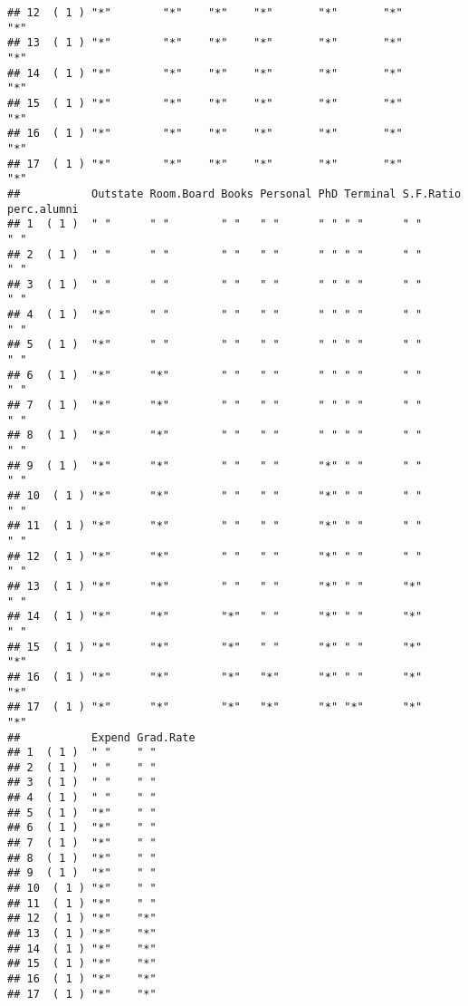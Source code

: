 \documentclass[
]{article}
\begin{document}
\begin{verbatim}
## 12  ( 1 ) "*"        "*"    "*"    "*"       "*"       "*"         "*"        
## 13  ( 1 ) "*"        "*"    "*"    "*"       "*"       "*"         "*"        
## 14  ( 1 ) "*"        "*"    "*"    "*"       "*"       "*"         "*"        
## 15  ( 1 ) "*"        "*"    "*"    "*"       "*"       "*"         "*"        
## 16  ( 1 ) "*"        "*"    "*"    "*"       "*"       "*"         "*"        
## 17  ( 1 ) "*"        "*"    "*"    "*"       "*"       "*"         "*"        
##           Outstate Room.Board Books Personal PhD Terminal S.F.Ratio perc.alumni
## 1  ( 1 )  " "      " "        " "   " "      " " " "      " "       " "        
## 2  ( 1 )  " "      " "        " "   " "      " " " "      " "       " "        
## 3  ( 1 )  " "      " "        " "   " "      " " " "      " "       " "        
## 4  ( 1 )  "*"      " "        " "   " "      " " " "      " "       " "        
## 5  ( 1 )  "*"      " "        " "   " "      " " " "      " "       " "        
## 6  ( 1 )  "*"      "*"        " "   " "      " " " "      " "       " "        
## 7  ( 1 )  "*"      "*"        " "   " "      " " " "      " "       " "        
## 8  ( 1 )  "*"      "*"        " "   " "      " " " "      " "       " "        
## 9  ( 1 )  "*"      "*"        " "   " "      "*" " "      " "       " "        
## 10  ( 1 ) "*"      "*"        " "   " "      "*" " "      " "       " "        
## 11  ( 1 ) "*"      "*"        " "   " "      "*" " "      " "       " "        
## 12  ( 1 ) "*"      "*"        " "   " "      "*" " "      " "       " "        
## 13  ( 1 ) "*"      "*"        " "   " "      "*" " "      "*"       " "        
## 14  ( 1 ) "*"      "*"        "*"   " "      "*" " "      "*"       " "        
## 15  ( 1 ) "*"      "*"        "*"   " "      "*" " "      "*"       "*"        
## 16  ( 1 ) "*"      "*"        "*"   "*"      "*" " "      "*"       "*"        
## 17  ( 1 ) "*"      "*"        "*"   "*"      "*" "*"      "*"       "*"        
##           Expend Grad.Rate
## 1  ( 1 )  " "    " "      
## 2  ( 1 )  " "    " "      
## 3  ( 1 )  " "    " "      
## 4  ( 1 )  " "    " "      
## 5  ( 1 )  "*"    " "      
## 6  ( 1 )  "*"    " "      
## 7  ( 1 )  "*"    " "      
## 8  ( 1 )  "*"    " "      
## 9  ( 1 )  "*"    " "      
## 10  ( 1 ) "*"    " "      
## 11  ( 1 ) "*"    " "      
## 12  ( 1 ) "*"    "*"      
## 13  ( 1 ) "*"    "*"      
## 14  ( 1 ) "*"    "*"      
## 15  ( 1 ) "*"    "*"      
## 16  ( 1 ) "*"    "*"      
## 17  ( 1 ) "*"    "*"
\end{verbatim}
\end{document}
